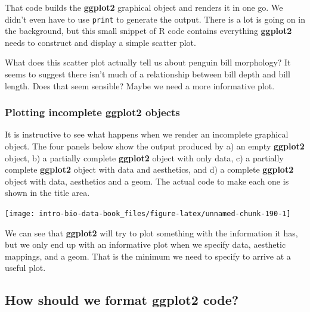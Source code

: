 \documentclass[
]{book}
\newenvironment{greybox}{
  \definecolor{shadecolor}{rgb}{0.95,0.95,0.95}  %
  \color{black}
  \begin{shaded}}
 {\end{shaded}}
\newenvironment{infobox}[1]
  {
  \begin{itemize}
  \renewcommand{\labelitemi}{
    \raisebox{-.7\height}[0pt][0pt]{
      {\setkeys{Gin}{width=3em,keepaspectratio}
        \texttt{[image: images/\#1]}}
    }
  }
  \setlength{\fboxsep}{1em}
  \begin{greybox}
  \item
  }
  {
  \end{greybox}
  \end{itemize}
  }
\begin{document}
That code builds the \textbf{ggplot2} graphical object and renders it in one go. We didn't even have to use \texttt{print} to generate the output. There is a lot is going on in the background, but this small snippet of R code contains everything \textbf{ggplot2} needs to construct and display a simple scatter plot.

What does this scatter plot actually tell us about penguin bill morphology? It seems to suggest there isn't much of a relationship between bill depth and bill length. Does that seem sensible? Maybe we need a more informative plot.

\begin{infobox}{information}

\hypertarget{plotting-incomplete-ggplot2-objects}{%
\subsubsection*{\texorpdfstring{Plotting incomplete \textbf{ggplot2} objects}{Plotting incomplete ggplot2 objects}}\label{plotting-incomplete-ggplot2-objects}}

It is instructive to see what happens when we render an incomplete graphical object. The four panels below show the output produced by a) an empty \textbf{ggplot2} object, b) a partially complete \textbf{ggplot2} object with only data, c) a partially complete \textbf{ggplot2} object with data and aesthetics, and d) a complete \textbf{ggplot2} object with data, aesthetics and a geom. The actual code to make each one is shown in the title area.

\begin{center}\texttt{[image: intro-bio-data-book\_files/figure-latex/unnamed-chunk-190-1]} \end{center}

We can see that \textbf{ggplot2} will try to plot something with the information it has, but we only end up with an informative plot when we specify data, aesthetic mappings, and a geom. That is the minimum we need to specify to arrive at a useful plot.

\end{infobox}

\hypertarget{how-should-we-format-ggplot2-code}{%
\subsection{\texorpdfstring{How should we format \textbf{ggplot2} code?}{How should we format ggplot2 code?}}\label{how-should-we-format-ggplot2-code}}
\end{document}
